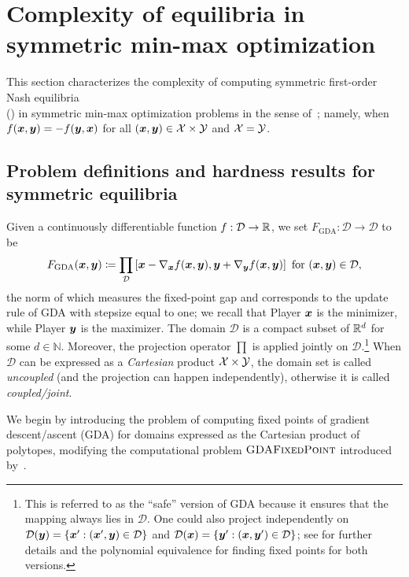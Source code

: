 \section{Complexity of equilibria in symmetric min-max optimization}


This section characterizes the complexity of computing symmetric first-order Nash equilibria\\ () in symmetric min-max optimization problems in the sense of~; namely, when $f({\bm{x}}, {\bm{y}}) = - f({\bm{y}}, {\bm{x}})$ for all $({\bm{x}}, {\bm{y}}) \in \mathcal{X} \times \mathcal{Y}$ and $\mathcal{X} = \mathcal{Y}$. 


\subsection{Problem definitions and hardness results for symmetric equilibria}
\label{sec:symmetric}

Given a continuously differentiable function $f : \mathcal{D} \to \mathbb{R}$, we set $F_{\textrm{GDA}}:\mathcal{D} \to \mathcal{D}$ to be
$$F_{\textrm{GDA}}({\bm{x}},{\bm{y}}) \coloneqq \prod_{\mathcal{D}} \left[{\bm{x}} - \nabla_{{\bm{x}}}f({\bm{x}},{\bm{y}}),{\bm{y}} + \nabla_{{\bm{y}}}f({\bm{x}},{\bm{y}})\right] \textrm{ for }({\bm{x}},{\bm{y}})\in \mathcal{D},$$
the norm of which measures the fixed-point gap and corresponds to the update rule of GDA with stepsize equal to one; we recall that Player ${\bm{x}}$ is the minimizer, while Player ${\bm{y}}$ is the maximizer. The domain $\mathcal{D}$ is a compact subset of $\mathbb{R}^d$ for some $d \in \mathbb{N}$. Moreover, the projection operator $\prod$ is applied jointly on $\mathcal{D}$.\footnote{This is referred to as the ``safe'' version of GDA because it ensures that the mapping always lies in $\mathcal{D}$. One could also project independently on $\mathcal{D}({\bm{y}})=\{{\bm{x}}': ({\bm{x}}',{\bm{y}})\in\mathcal{D}\}$ and $\mathcal{D}({\bm{x}})=\{{\bm{y}}': ({\bm{x}},{\bm{y}}')\in\mathcal{D}\}$; see \citet{DSZ21} for further details and the polynomial equivalence for finding fixed points for both versions.} When $\mathcal{D}$ can be expressed as a \emph{Cartesian} product $\mathcal{X}\times\mathcal{Y}$, the domain set is called \emph{uncoupled} (and the projection can happen independently), otherwise it is called \emph{coupled/joint}.

We begin by introducing the problem of computing fixed points of gradient descent/ascent (GDA) for domains expressed as the Cartesian product of polytopes, modifying the computational problem $\textsc{GDAFixedPoint}$ introduced by~\citet{DSZ21}.

